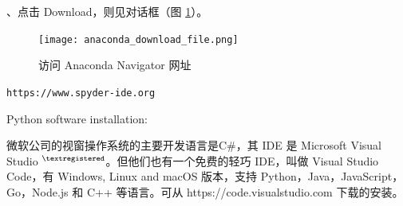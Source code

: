 \documentclass[main.tex]{subfiles}
\begin{document}
、点击 Download，则见对话框（图 \ref{fig:1.3}）。
\begin{figure}[b]
	\centering
	\texttt{[image: anaconda\_download\_file.png]}
	\caption{访问 Anaconda Navigator 网址}
	\label{fig:1.3}
\end{figure}


\verb|https://www.spyder-ide.org|

Python software installation:



微软公司的视窗操作系统的主要开发语言是C\#，其 IDE 是 Microsoft Visual Studio ${}^{\textregistered}$。但他们也有一个免费的轻巧 IDE，叫做 Visual Studio Code，有 Windows, Linux and macOS 版本，支持 Python，Java，JavaScript，Go，Node.js 和 C++ 等语言。可从
https://code.visualstudio.com
下载的安装。
\end{document}
